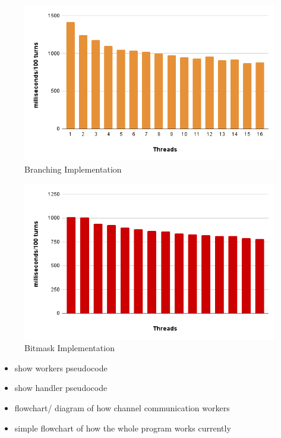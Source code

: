 \documentclass[twoside,twocolumn]{article}
\begin{document}
\begin{figure}
  \includegraphics[width=\linewidth]{branching.png}
  \caption{Branching Implementation}
  \label{fig:chart2}
\end{figure}
\begin{figure}
  \includegraphics[width=\linewidth]{bitmask.png}
  \caption{Bitmask Implementation}
  \label{fig:chart3}
\end{figure}
\begin{itemize}
  \item show workers pseudocode
  \item show handler pseudocode
  \item flowchart/ diagram of how channel communication workers
  \item simple flowchart of how the whole program works currently
\end{itemize}
\end{document}

